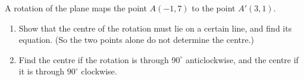 A rotation of the plane maps the point $A(-1,7)$ to the point $A'(3,1)$.
\begin{enumerate}
\item[(a)] Show that the centre of the rotation must lie on a certain line, and find its equation. (So the two points alone do not determine the centre.)
\item[(b)] Find the centre if the rotation is through $90^\circ$ anticlockwise, and the centre if it is through $90^\circ$ clockwise.
\end{enumerate}
